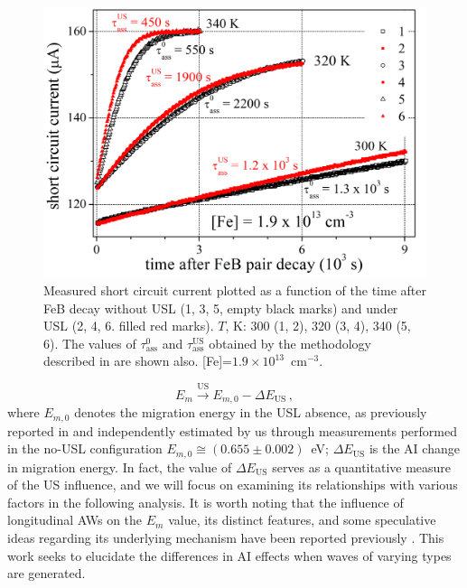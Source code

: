 \documentclass{ttp}
\begin{document}

\begin{figure}
	\centering
     \includegraphics[width=\linewidth]{Fig1.png}
	  \caption{Measured short circuit current plotted as a function of the time after FeB decay
      without USL (1, 3, 5, empty black marks) and under USL (2, 4, 6. filled red marks).
      $T$, K: 300 (1, 2), 320 (3, 4), 340 (5, 6).
      The values of $\tau_\mathrm{ass}^0$ and $\tau_\mathrm{ass}^\mathrm{US}$ obtained
      by the methodology described in \cite{Olikh2021JAP,Olikh2022:JMatSci} are shown also.
      [Fe]=$1.9\times10^{13}$~cm$^{-3}$.
}\label{fig1}
\end{figure}

\begin{equation}
\label{eqEmUs}
E_m \xrightarrow{\mathrm{US}} E_{m,0}-\Delta E_\mathrm{US}\,,
\end{equation}
where
$E_{m,0}$ denotes the migration energy in the USL absence,
as previously reported in \cite{FeBAssJAP2014}
and independently estimated by us through measurements performed in the no-USL configuration
$E_{m,0}\cong(0.655\pm0.002)$~eV;
$\Delta E_\mathrm{US}$ is the AI change in migration energy.
In fact, the value of $\Delta E_\mathrm{US}$ serves as a quantitative measure
of the US influence, and we will focus on examining its relationships with various factors in the following analysis.
It is worth noting that the influence of longitudinal AWs on the $E_m$ value,
its distinct features, and some speculative ideas regarding its underlying mechanism have been reported previously \cite{Olikh2021JAP,Olikh2022:JMatSci}.
This work seeks to elucidate the differences in AI effects when waves of varying types are generated.
\end{document}
